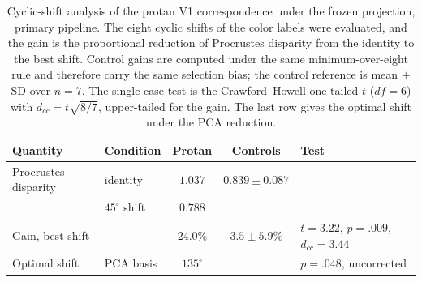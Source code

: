 \begin{table}[h]
\centering
\caption{Cyclic-shift analysis of the protan V1 correspondence under the frozen projection, primary pipeline. The eight cyclic shifts of the color labels were evaluated, and the gain is the proportional reduction of Procrustes disparity from the identity to the best shift. Control gains are computed under the same minimum-over-eight rule and therefore carry the same selection bias; the control reference is mean $\pm$ SD over $n = 7$. The single-case test is the Crawford--Howell one-tailed $t$ ($df = 6$) with $d_{cc} = t\sqrt{8/7}$, upper-tailed for the gain. The last row gives the optimal shift under the PCA reduction.}
\label{tab:cyclic_shift}
\small
\setlength{\tabcolsep}{4pt}
\begin{tabular}{llccl}
\toprule
Quantity & Condition & Protan & Controls & Test \\
\midrule
Procrustes disparity & identity & $1.037$ & $0.839 \pm 0.087$ & \\
 & $45^\circ$ shift & $0.788$ & & \\
Gain, best shift & & $24.0\%$ & $3.5 \pm 5.9\%$ & $t = 3.22$, $p = .009$, $d_{cc} = 3.44$ \\
\midrule
Optimal shift & PCA basis & $135^\circ$ & & $p = .048$, uncorrected \\
\bottomrule
\end{tabular}
\end{table}
